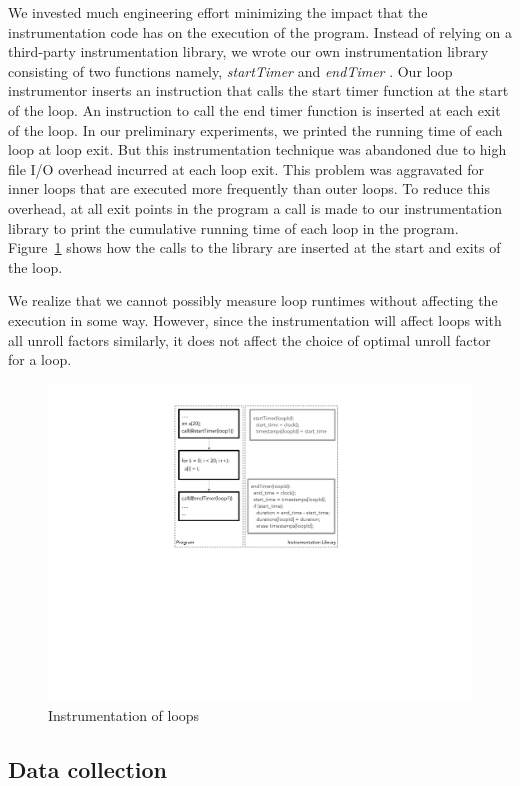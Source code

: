 \documentclass[]{sig-alternate}
\begin{document}
We invested much engineering effort minimizing the impact that the instrumentation code has on the execution of the program. Instead of relying on a third-party instrumentation library, we wrote our own instrumentation library consisting of two functions namely, \emph{startTimer} and \emph{endTimer} . Our loop instrumentor inserts an instruction that calls the start timer function at the start of the loop. An instruction to call the end timer function is inserted at each exit of the loop. In our preliminary experiments, we printed the running time of each loop at loop exit. But this instrumentation technique was abandoned due to high file I/O overhead incurred at each loop exit. This problem was aggravated for inner loops that are executed more frequently than outer loops. To reduce this overhead, at all exit points in the program a call is made to our instrumentation library to print the cumulative running time of each loop in the program. Figure~\ref{fig:instrumentation} shows how the calls to the library are inserted at the start and exits of the loop.

We realize that we cannot possibly measure loop runtimes without affecting the execution in some way. However, since the instrumentation will affect loops with all unroll factors similarly, it does not affect the choice of optimal unroll factor for a loop. 

\begin{figure}
  \center
  \includegraphics[width=0.90\linewidth]{fig/instrumentation.pdf}
  \caption{Instrumentation of loops}
  \label{fig:instrumentation}
\end{figure}

\subsection{Data collection}
\label{subsec:DataCollection}
\end{document}
